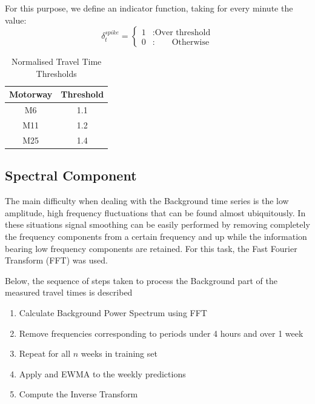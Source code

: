 \documentclass[conference]{IEEEtran}
\begin{document}
For this purpose, we define an indicator function, taking for every minute the value:\\
\begin{equation}
\delta_t^{spike}= \left\{
\begin{array}{lr}
1 & : \textrm{Over threshold}\\
0 & : \,\,\,\,\,\,\,\,\,\,\,\,\textrm{Otherwise}
\end{array}
\right.
\label{eq:delta}
\end{equation}

\begin{table}[htbp]
	\caption{Normalised Travel Time Thresholds}
	\begin{center}
		\begin{tabular}{|c|c|}
			\hline
			\textbf{Motorway}&{\textbf{Threshold}} \\
			\hline
			M6& 1.1\\
			\hline
			M11& 1.2\\
			\hline
			M25& 1.4\\
			\hline
		\end{tabular}
		\label{tab1}
	\end{center}
\end{table}

\subsection{Spectral Component}
The main difficulty when dealing with the Background time series is the low amplitude, high frequency fluctuations that can be found almost ubiquitously. 
In these situations signal smoothing can be easily performed by removing completely the frequency components from a certain frequency and up while the information bearing low frequency components are retained. For this task, the Fast Fourier Transform (FFT) \cite{FFT} was used.

Below, the sequence of steps taken to process the Background part of the measured travel times is described
\begin{enumerate}

	\item Calculate Background Power Spectrum using FFT
	\item Remove frequencies corresponding to periods under 4 hours and over 1 week
	\item Repeat for all $n$ weeks in training set
    \item Apply and EWMA to the weekly predictions
	\item Compute the Inverse Transform

\end{enumerate}
\end{document}
